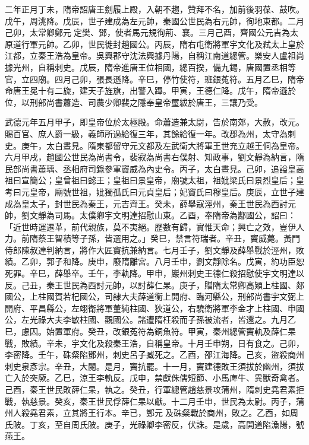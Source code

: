 \begin{pinyinscope}
 二年正月丁未，隋帝詔唐王劍履上殿，入朝不趨，贊拜不名，加前後羽葆、鼓吹。戊午，周洮降。戊辰，世子建成為左元帥，秦國公世民為右元帥，徇地東都。二月己卯，太常卿鄭元定樊、鄧，使者馬元規徇荊、襄。三月己酉，齊國公元吉為太原道行軍元帥。乙卯，世民徙封趙國公。丙辰，隋右屯衛將軍宇文化及弒太上皇於江都，立秦王浩為皇帝。吳興郡守沈法興據丹陽，自稱江南道總管。樂安人盧祖尚據光州，自稱刺史。戊辰，隋帝進唐王位相國，總百揆，備九錫，唐國置丞相等官，立四廟。四月己卯，張長遜降。辛巳，停竹使符，班銀菟符。五月乙巳，隋帝命唐王冕十有二旒，建天子旌旗，出警入蹕。甲寅，王德仁降。戊午，隋帝遜於位，以刑部尚書蕭造、司農少卿裴之隱奉皇帝璽紱於唐王，三讓乃受。



 武德元年五月甲子，即皇帝位於太極殿。命蕭造兼太尉，告於南郊，大赦，改元。賜百官、庶人爵一級，義師所過給復三年，其餘給復一年。改郡為州，太守為刺史。庚午，太白晝見。隋東都留守元文都及左武衛大將軍王世充立越王侗為皇帝。六月甲戌，趙國公世民為尚書令，裴寂為尚書右僕射、知政事，劉文靜為納言，隋民部尚書蕭瑀、丞相府司錄參軍竇威為內史令。丙子，太白晝見。己卯，追謚皇高祖曰宣簡公；皇曾祖曰懿王；皇祖曰景皇帝，廟號太祖，祖妣梁氏曰景烈皇后；皇考曰元皇帝，廟號世祖，妣獨孤氏曰元貞皇后；妃竇氏曰穆皇后。庚辰，立世子建成為皇太子，封世民為秦王，元吉齊王。癸未，薛舉寇涇州，秦王世民為西討元帥，劉文靜為司馬。太僕卿宇文明達招慰山東。乙酉，奉隋帝為酅國公，詔曰：「近世時運遷革，前代親族，莫不夷絕。歷數有歸，實惟天命；興亡之效，豈伊人力。前隋蔡王智積等子孫，皆選用之。」癸巳，禁言符瑞者。辛丑，竇威薨。黃門侍郎陳叔達判納言，將作大匠竇抗兼納言。七月壬子，劉文靜及薛舉戰於涇州，敗績。乙卯，郭子和降。庚申，廢隋離宮。八月壬申，劉文靜除名。戊寅，約功臣恕死罪。辛巳，薛舉卒。壬午，李軌降。甲申，巖州刺史王德仁殺招慰使宇文明達以反。己丑，秦王世民為西討元帥，以討薛仁杲。庚子，贈隋太常卿高熲上柱國、郯國公，上柱國賀若杞國公，司隸大夫薛道衡上開府、臨河縣公，刑部尚書宇文弼上開府、平昌縣公，左翊衛將軍董純柱國、狄道公，右驍衛將軍李金才上柱國、申國公，左光祿大夫李敏柱國、觀國公。諸遭隋枉殺而子孫被流者，皆還之。九月乙巳，慮囚。始置軍府。癸丑，改銀菟符為銅魚符。甲寅，秦州總管竇軌及薛仁杲戰，敗績。辛未，宇文化及殺秦王浩，自稱皇帝。十月壬申朔，日有食之。己卯，李密降。壬午，硃粲陷鄧州，刺史呂子臧死之。乙酉，邵江海降。己亥，盜殺商州刺史泉彥宗。辛丑，大閱。是月，竇抗罷。十一月，竇建德敗王須拔於幽州，須拔亡入於突厥。乙巳，涼王李軌反。戊申，禁獻侏儒短節、小馬庳牛、異獸奇禽者。己酉，秦王世民敗薛仁杲，執之。癸丑，行軍總管趙慈景攻蒲州，隋刺史堯君素拒戰，執慈景。癸亥，秦王世民俘薛仁杲以獻。十二月壬申，世民為太尉。丙子，蒲州人殺堯君素，立其將王行本。辛已，鄭元及硃粲戰於商州，敗之。乙酉，如周氏陂。丁亥，至自周氏陂。庚子，光祿卿李密反，伏誅。是歲，高開道陷漁陽，號燕王。




\end{pinyinscope}
